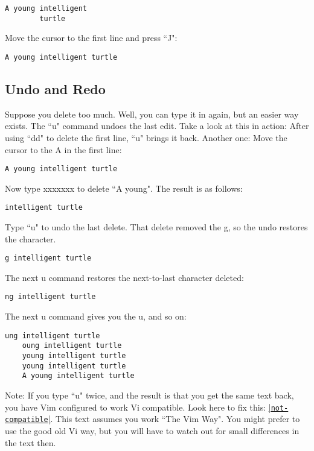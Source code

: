 		\begin{Verbatim}[samepage=true]
		A young intelligent
		turtle
		\end{Verbatim}

Move the cursor to the first line and press ``J":

		\begin{Verbatim}[samepage=true]
		A young intelligent turtle
		\end{Verbatim}

\subsection{Undo and Redo}
\label{Undo and Redo}

Suppose you delete too much.
Well, you can type it in again, but an easier way exists.
The ``u" command undoes the last edit.
Take a look at this in action: After using ``dd" to delete the first line, ``u" brings it back.
Another one: Move the cursor to the A in the first line:

		\begin{Verbatim}[samepage=true]
		A young intelligent turtle
						\end{Verbatim}

Now type xxxxxxx to delete ``A young".
The result is as follows:

	\begin{Verbatim}[samepage=true]
	intelligent turtle
	\end{Verbatim}

Type ``u" to undo the last delete.
That delete removed the g, so the undo restores the character.

	\begin{Verbatim}[samepage=true]
	g intelligent turtle
	\end{Verbatim}

The next u command restores the next-to-last character deleted:

	\begin{Verbatim}[samepage=true]
	ng intelligent turtle
	\end{Verbatim}

The next u command gives you the u, and so on:

	\begin{Verbatim}[samepage=true]
	ung intelligent turtle
	oung intelligent turtle
	young intelligent turtle
	young intelligent turtle
	A young intelligent turtle
	\end{Verbatim}

Note:
If you type ``u" twice, and the result is that you get the same text back, you have Vim configured to work Vi compatible.
Look here to fix this: \hyperref[not-compatible]{|\texttt{not-compatible}|}.
This text assumes you work ``The Vim Way".
You might prefer to use the good old Vi way, but you will have to watch out for small differences in the text then.

